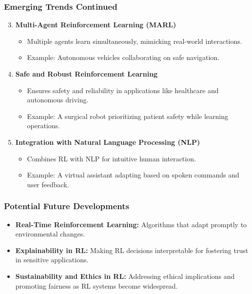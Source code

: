 \documentclass[aspectratio=169]{beamer}
\begin{document}
\begin{frame}[fragile]
    \frametitle{Emerging Trends Continued}
    \begin{enumerate}
        \setcounter{enumi}{2}
        \item \textbf{Multi-Agent Reinforcement Learning (MARL)}
            \begin{itemize}
                \item Multiple agents learn simultaneously, mimicking real-world interactions.
                \item Example: Autonomous vehicles collaborating on safe navigation.
            \end{itemize}
        
        \item \textbf{Safe and Robust Reinforcement Learning}
            \begin{itemize}
                \item Ensures safety and reliability in applications like healthcare and autonomous driving.
                \item Example: A surgical robot prioritizing patient safety while learning operations.
            \end{itemize}

        \item \textbf{Integration with Natural Language Processing (NLP)}
            \begin{itemize}
                \item Combines RL with NLP for intuitive human interaction.
                \item Example: A virtual assistant adapting based on spoken commands and user feedback.
            \end{itemize}
    \end{enumerate}
\end{frame}

\begin{frame}[fragile]
    \frametitle{Potential Future Developments}
    \begin{itemize}
        \item \textbf{Real-Time Reinforcement Learning:} Algorithms that adapt promptly to environmental changes.
        
        \item \textbf{Explainability in RL:} Making RL decisions interpretable for fostering trust in sensitive applications.
        
        \item \textbf{Sustainability and Ethics in RL:} Addressing ethical implications and promoting fairness as RL systems become widespread.
    \end{itemize}
\end{frame}
\end{document}
